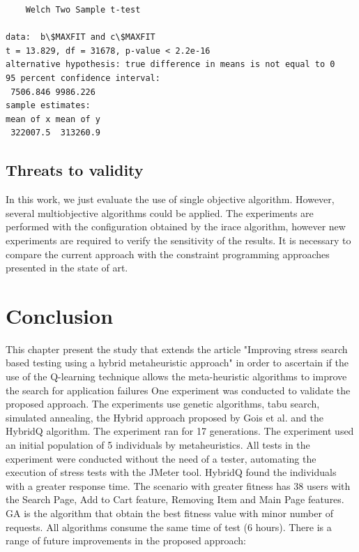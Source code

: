 \documentclass{report}
\begin{document}
\begin{lstlisting}
	Welch Two Sample t-test

data:  b\$MAXFIT and c\$MAXFIT
t = 13.829, df = 31678, p-value < 2.2e-16
alternative hypothesis: true difference in means is not equal to 0
95 percent confidence interval:
 7506.846 9986.226
sample estimates:
mean of x mean of y
 322007.5  313260.9

\end{lstlisting}



\subsection{Threats to validity}

In this work, we just evaluate the use of single objective algorithm. However, several multiobjective algorithms could be applied.  The experiments are performed with the configuration obtained by the irace algorithm, however new experiments are required to verify the sensitivity of the results. It is necessary to compare the current approach with the constraint programming approaches presented in the state of art.



\section{Conclusion}

This chapter present the study that extends the article "Improving stress search based testing using a hybrid metaheuristic approach" in order to ascertain if the use of the Q-learning technique allows the meta-heuristic algorithms to improve the search for application failures One experiment was conducted to validate the proposed approach. The experiments use genetic algorithms, tabu search, simulated annealing, the Hybrid approach proposed by Gois et al. \cite{Gois2016} and the HybridQ algorithm. The experiment ran for 17 generations. The experiment used an initial population of 5 individuals by metaheuristics. All tests in the experiment were conducted without the need of a tester, automating the execution of stress tests with the JMeter tool.  HybridQ found the individuals with a greater response time. The scenario with greater fitness has 38 users with the Search Page, Add to Cart feature, Removing Item and Main Page features. GA is the algorithm that obtain the best fitness value with minor number of requests. All algorithms consume the same time of test (6 hours). There is a range of future improvements in the proposed approach:
\end{document}

